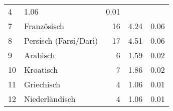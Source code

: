 \begin{longtable}{lXrrr}
       \num{4} &
       \num[round-mode=places,round-precision=2]{1.06} &
         \num[round-mode=places,round-precision=2]{0.01} \\

     7 &
     \multicolumn{1}{X}{ Französisch   } &


       \num{16} &
       \num[round-mode=places,round-precision=2]{4.24} &
         \num[round-mode=places,round-precision=2]{0.06} \\

     8 &
     \multicolumn{1}{X}{ Persisch (Farsi/Dari)   } &


       \num{17} &
       \num[round-mode=places,round-precision=2]{4.51} &
         \num[round-mode=places,round-precision=2]{0.06} \\

     9 &
     \multicolumn{1}{X}{ Arabisch   } &


       \num{6} &
       \num[round-mode=places,round-precision=2]{1.59} &
         \num[round-mode=places,round-precision=2]{0.02} \\

     10 &
     \multicolumn{1}{X}{ Kroatisch   } &


       \num{7} &
       \num[round-mode=places,round-precision=2]{1.86} &
         \num[round-mode=places,round-precision=2]{0.02} \\

     11 &
     \multicolumn{1}{X}{ Griechisch   } &


       \num{4} &
       \num[round-mode=places,round-precision=2]{1.06} &
         \num[round-mode=places,round-precision=2]{0.01} \\

     12 &
     \multicolumn{1}{X}{ Niederländisch   } &


       \num{4} &
       \num[round-mode=places,round-precision=2]{1.06} &
         \num[round-mode=places,round-precision=2]{0.01} \\


\end{longtable}
